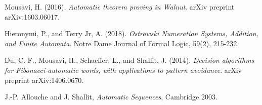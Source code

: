 \documentclass[a4paper]{article}
\begin{document}
\begin{thebibliography}{9}
Mousavi, H. (2016). \textit{Automatic theorem proving in Walnut}. arXiv preprint arXiv:1603.06017.
 
Hieronymi, P., and Terry Jr, A. (2018). \textit{Ostrowski Numeration Systems, Addition, and Finite Automata}. Notre Dame Journal of Formal Logic, 59(2), 215-232.
 
Du, C. F., Mousavi, H., Schaeffer, L., and Shallit, J. (2014). \textit{Decision algorithms for Fibonacci-automatic words, with applications to pattern avoidance}. arXiv preprint arXiv:1406.0670.

J.-P. Allouche and J. Shallit, \textit{Automatic Sequences}, Cambridge 2003.

\end{thebibliography}
\end{document}

